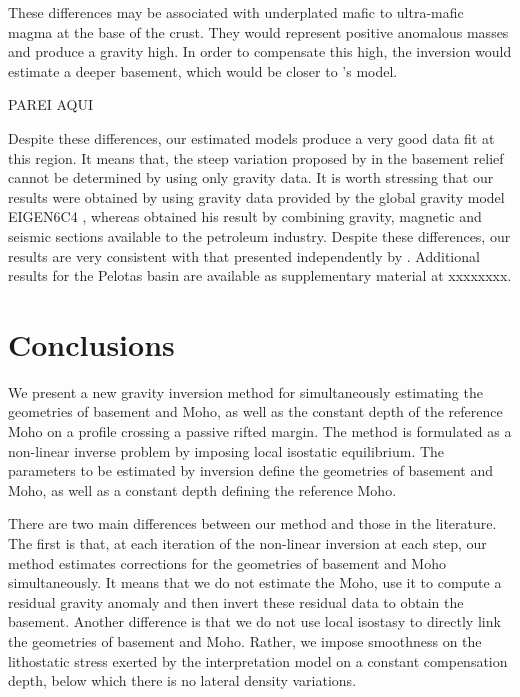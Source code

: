 \documentclass[manuscript]{geophysics}
\begin{document}
These differences may be associated with underplated mafic to ultra-mafic 
magma at the base of the crust. They would represent positive anomalous
masses and produce a gravity high. In order to compensate this high, the 
inversion would estimate a deeper basement, which would be closer to 
\citeauthor{zalan2015}'s model.

PAREI AQUI

Despite these differences, our estimated models produce a very good data fit
at this region. It means that, the steep variation 
proposed by \citeauthor{zalan2015} in the basement relief cannot be determined by 
using only gravity data.
It is worth stressing that our results were obtained by using gravity data
provided by the global gravity model EIGEN6C4 \citep{forste2014}, whereas 
\citet{zalan2015} obtained his result by combining gravity, magnetic and seismic sections
available to the petroleum industry. Despite these differences, our results are very 
consistent with that presented independently by \citet{zalan2015}.
Additional results for the Pelotas basin are available as supplementary material at xxxxxxxx.


\section{Conclusions}

We present a new gravity inversion method for simultaneously estimating the 
geometries of basement and Moho, as well as the constant depth of the reference 
Moho on a profile crossing a passive rifted margin.
The method is formulated as a non-linear inverse problem by imposing local
isostatic equilibrium.
The parameters to be estimated by inversion define the geometries of basement and Moho, 
as well as a constant depth defining the reference Moho.

There are two main differences between our method and those in the literature.
The first is that, at each iteration of the non-linear inversion at each step, 
our method estimates corrections for the geometries of basement and Moho simultaneously. 
It means that we do not estimate the Moho, use it to compute a residual gravity anomaly
and then invert these residual data to obtain the basement.
Another difference is that we do not use local isostasy to directly link
the geometries of basement and Moho.
Rather, we impose smoothness on the lithostatic stress exerted by the interpretation 
model on a constant compensation depth, below which there is no lateral density variations.
\end{document}
